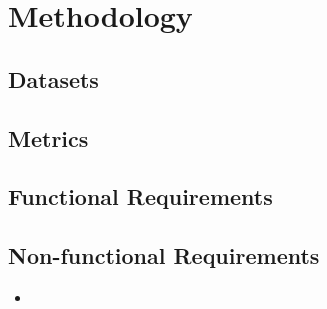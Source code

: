 \chapter{Methodology}
\label{chap:methods}

\section{Datasets}

\section{Metrics}

\section{Functional Requirements}


\section{Non-functional Requirements}

\begin{itemize}
    \item 
\end{itemize}